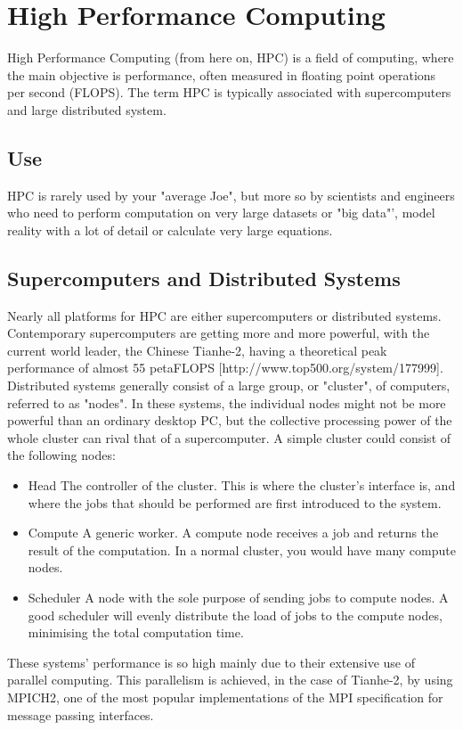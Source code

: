\chapter{High Performance Computing}
High Performance Computing (from here on, HPC) is a field of computing, where the main objective is performance, often measured in floating point operations per second (FLOPS). The term HPC is typically associated with supercomputers and large distributed system.

\section{Use}
HPC is rarely used by your "average Joe", but more so by scientists and engineers who need to perform computation on very large datasets or "big data"', model reality with a lot of detail or calculate very large equations.

\section{Supercomputers and Distributed Systems}
Nearly all platforms for HPC are either supercomputers or distributed systems. Contemporary supercomputers are getting more and more powerful, with the current world leader, the Chinese Tianhe-2, having a theoretical peak performance of almost 55 petaFLOPS [http://www.top500.org/system/177999].
Distributed systems generally consist of a large group, or "cluster", of computers, referred to as "nodes". In these systems, the individual nodes might not be more powerful than an ordinary desktop PC, but the collective processing power of the whole cluster can rival that of a supercomputer.
A simple cluster could consist of the following nodes:
\begin{itemize}
	\item Head
	The controller of the cluster. This is where the cluster's interface is, and where the jobs that should be performed are first introduced to the system.
	\item Compute
	A generic worker. A compute node receives a job and returns the result of the computation. In a normal cluster, you would have many compute nodes.
	\item Scheduler
	A node with the sole purpose of sending jobs to compute nodes. A good scheduler will evenly distribute the load of jobs to the compute nodes, minimising the total computation time.
\end{itemize}

These systems' performance is so high mainly due to their extensive use of parallel computing. This parallelism is achieved, in the case of Tianhe-2, by using MPICH2, one of the most popular implementations of the MPI specification for message passing interfaces.

